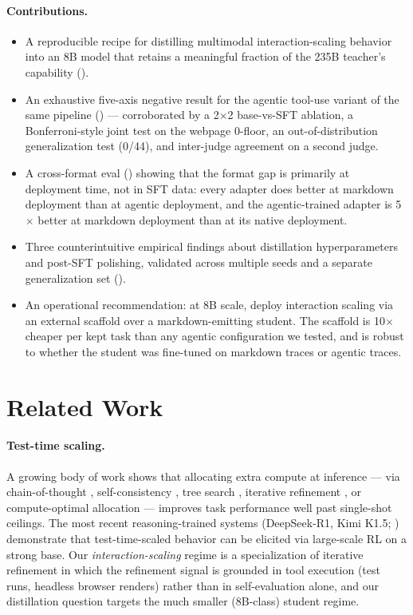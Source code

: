 \documentclass[11pt]{article}
\begin{document}
\paragraph{Contributions.}
\begin{itemize}[leftmargin=*,topsep=0.2ex,itemsep=0.2ex]
  \item A reproducible recipe for distilling multimodal interaction-scaling behavior into an 8B model that retains a meaningful fraction of the 235B teacher's capability ().
  \item An exhaustive five-axis negative result for the agentic tool-use variant of the same pipeline () --- corroborated by a 2$\times$2 base-vs-SFT ablation, a Bonferroni-style joint test on the webpage 0-floor, an out-of-distribution generalization test (0/44), and inter-judge agreement on a second judge.
  \item A cross-format eval () showing that the format gap is primarily at deployment time, not in SFT data: every adapter does better at markdown deployment than at agentic deployment, and the agentic-trained adapter is 5$\times$ better at markdown deployment than at its native deployment.
  \item Three counterintuitive empirical findings about distillation hyperparameters and post-SFT polishing, validated across multiple seeds and a separate generalization set ().
  \item An operational recommendation: at 8B scale, deploy interaction scaling via an external scaffold over a markdown-emitting student. The scaffold is 10$\times$ cheaper per kept task than any agentic configuration we tested, and is robust to whether the student was fine-tuned on markdown traces or agentic traces.
\end{itemize}

\section{Related Work}
\label{sec:related}

\paragraph{Test-time scaling.} A growing body of work shows that allocating extra compute at inference --- via chain-of-thought \citep{wei2022chain}, self-consistency \citep{wang2023selfconsistency}, tree search \citep{yao2023tree}, iterative refinement \citep{shinn2023reflexion,madaan2023selfrefine}, or compute-optimal allocation \citep{snell2024scaling,beeching2024searchscale} --- improves task performance well past single-shot ceilings. The most recent reasoning-trained systems (DeepSeek-R1, Kimi K1.5; \citealp{deepseek2025r1,kimi2025k15}) demonstrate that test-time-scaled behavior can be elicited via large-scale RL on a strong base. Our \emph{interaction-scaling} regime is a specialization of iterative refinement in which the refinement signal is grounded in tool execution (test runs, headless browser renders) rather than in self-evaluation alone, and our distillation question targets the much smaller (8B-class) student regime.
\end{document}
